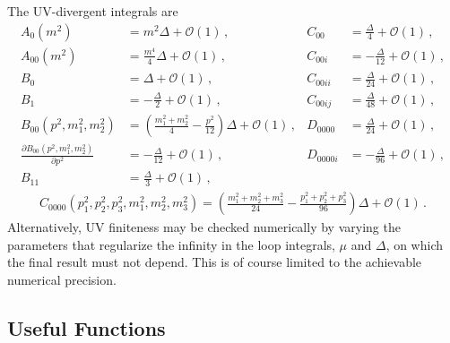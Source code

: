 \documentclass[twoside,11pt]{article}
\def\O{\mathcal{O}}
\begin{document}
The UV-divergent integrals are
\begin{align*}
A_0(m^2) &= m^2\Delta + \O(1)\,, &
	C_{00} &= \frac{\Delta}{4} + \O(1)\,, \\
A_{00}(m^2) &= \frac{m^4}{4}\Delta + \O(1)\,, &
	C_{00i} &= -\frac{\Delta}{12} + \O(1)\,, \\
B_0 &= \Delta + \O(1)\,, &
	C_{00ii} &= \frac{\Delta}{24} + \O(1)\,, \\
B_1 &= -\frac{\Delta}{2} + \O(1)\,, &
	C_{00ij} &= \frac{\Delta}{48} + \O(1)\,, \\
B_{00}(p^2, m_1^2, m_2^2) &=
	\left(\frac{m_1^2 + m_2^2}{4} - \frac{p^2}{12}\right)\Delta + \O(1)\,, &
	D_{0000} &= \frac{\Delta}{24} + \O(1)\,, \\
\frac{\partial B_{00}(p^2, m_1^2, m_2^2)}{\partial p^2} &=
	  -\frac{\Delta}{12} + \O(1)\,, &
	D_{0000i} &= -\frac{\Delta}{96} + \O(1)\,, \\
B_{11} &=
	\frac{\Delta}{3} + \O(1)\,,
\end{align*}
\vspace*{-5ex}%
\begin{gather*}
C_{0000}(p_1^2, p_2^2, p_3^2, m_1^2, m_2^2, m_3^2) =
	\left(\frac{m_1^2 + m_2^2 + m_3^2}{24} -
	  \frac{p_1^2 + p_2^2 + p_3^2}{96}\right)\Delta + \O(1)\,.
\end{gather*}
Alternatively, UV finiteness may be checked numerically by varying the
parameters that regularize the infinity in the loop integrals, $\mu$ and
$\Delta$, on which the final result must not depend.  This is of course
limited to the achievable numerical precision.


\subsection{Useful Functions}%
\end{document}
